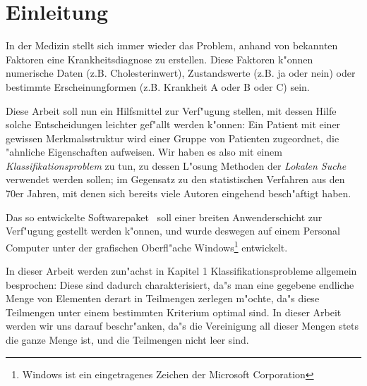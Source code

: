 \chapter*{Einleitung}

In der Medizin stellt sich immer wieder das Problem,
anhand von bekannten Faktoren eine Krankheitsdiagnose zu erstellen.
Diese Faktoren k"onnen numerische Daten (z.B. Cholesterinwert),
Zustandswerte (z.B. ja oder nein) oder bestimmte Erscheinungformen
(z.B. Krankheit A oder B oder C) sein.

Diese Arbeit soll nun ein Hilfsmittel zur Verf"ugung stellen, mit dessen Hilfe
solche Entscheidungen leichter gef"allt werden k"onnen:
Ein Patient mit einer gewissen Merkmalsstruktur wird einer
Gruppe von Patienten zugeordnet, die "ahnliche Eigenschaften aufweisen.
Wir haben es also mit einem {\em Klassifikationsproblem} zu tun, zu dessen
L"osung Methoden der {\em Lokalen Suche} verwendet werden sollen;
im Gegensatz zu den statistischen Verfahren aus den 70er Jahren, mit
denen sich bereits viele Autoren eingehend besch"aftigt haben.

Das so entwickelte Softwarepaket \Clustering\ soll einer breiten
Anwenderschicht zur Verf"ugung gestellt werden k"onnen, und wurde deswegen
auf einem Personal Computer unter der grafischen Oberfl"ache 
 Windows\footnote{Windows ist ein eingetragenes Zeichen
der Microsoft Corporation} entwickelt.



In dieser Arbeit werden zun"achst in Kapitel 1
 Klassifikationsprobleme allgemein besprochen:
Diese sind dadurch charakterisiert, da"s man eine
gegebene endliche Menge von Elementen derart in Teilmengen zerlegen 
m"ochte, da"s diese Teilmengen unter einem bestimmten 
Kriterium optimal sind. In dieser Arbeit werden wir
uns darauf beschr"anken, da"s die Vereinigung all dieser Mengen
stets die ganze Menge ist, und die Teilmengen nicht leer sind.

